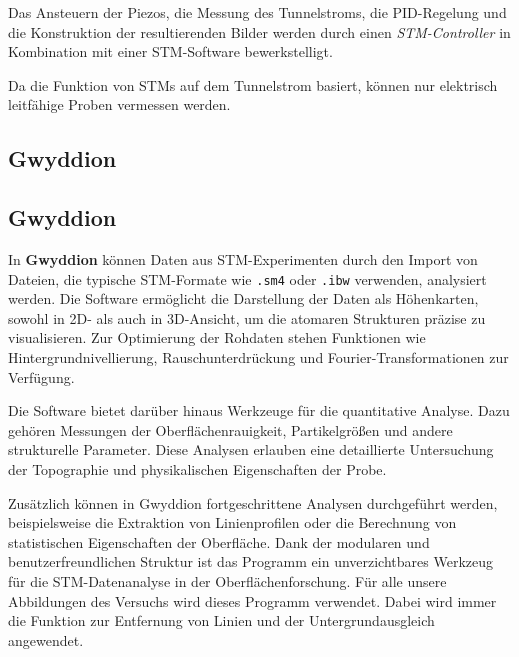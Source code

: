 \documentclass{article}
\begin{document}
Das Ansteuern der Piezos, die Messung des Tunnelstroms, die PID-Regelung und die Konstruktion der resultierenden Bilder werden
durch einen \textit{STM-Controller} in Kombination mit einer STM-Software bewerkstelligt.

Da die Funktion von STMs auf dem Tunnelstrom basiert, können nur elektrisch leitfähige
Proben vermessen werden. 

\subsection*{Gwyddion} 
\subsection*{Gwyddion} 
In \textbf{Gwyddion} können Daten aus STM-Experimenten durch den Import von Dateien, die typische STM-Formate wie \texttt{.sm4} oder \texttt{.ibw} verwenden, analysiert werden. Die Software ermöglicht die Darstellung der Daten als Höhenkarten, sowohl in 2D- als auch in 3D-Ansicht, um die atomaren Strukturen präzise zu visualisieren. Zur Optimierung der Rohdaten stehen Funktionen wie Hintergrundnivellierung, Rauschunterdrückung und Fourier-Transformationen zur Verfügung.

Die Software bietet darüber hinaus Werkzeuge für die quantitative Analyse. Dazu gehören Messungen der Oberflächenrauigkeit, Partikelgrößen und andere strukturelle Parameter. Diese Analysen erlauben eine detaillierte Untersuchung der Topographie und physikalischen Eigenschaften der Probe.

Zusätzlich können in Gwyddion fortgeschrittene Analysen durchgeführt werden, beispielsweise die Extraktion von Linienprofilen oder die Berechnung von statistischen Eigenschaften der Oberfläche. Dank der modularen und benutzerfreundlichen Struktur ist das Programm ein unverzichtbares Werkzeug für die STM-Datenanalyse in der Oberflächenforschung.
Für alle unsere Abbildungen des Versuchs wird dieses Programm verwendet.
Dabei wird immer die Funktion zur Entfernung von Linien und der Untergrundausgleich angewendet.
\end{document}
